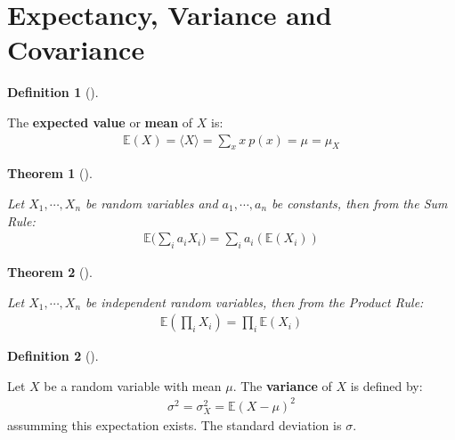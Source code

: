\documentclass[
  letterpaper,
  12pt,
  british]{tufte-book}
\theoremstyle{plain}
\newtheorem{theorem}{Theorem}[chapter]
\theoremstyle{plain}
\theoremstyle{definition}
\newtheorem{definition}{Definition}[chapter]
\theoremstyle{remark}
\begin{document}
\hypertarget{expectancy-variance-and-covariance}{%
\section{Expectancy, Variance and
Covariance}\label{expectancy-variance-and-covariance}}

\leavevmode{}%
\begin{definition}[]\label{def-mean}

The \textbf{expected value} or \textbf{mean} of \(\mathit{X}\) is:
\begin{align}
        \mathbb{E}(\mathit{X})=\langle \mathit{X}\rangle = \sum_{x} \mathit{x}~p(\mathit{x}) = \mu = \mu_X
\end{align}

\end{definition}

\leavevmode{}%
\begin{theorem}[]\label{thm-sum_rule}

Let \(\mathit{X}_1, \cdots, \mathit{X}_n\) be random variables and
\(a_1, \cdots, a_n\) be constants, then from the \emph{Sum Rule}:
\begin{align}
        \mathbb{E}\biggl(\sum_i a_i\mathit{X}_i\biggr)=\sum_i a_i(\mathbb{E}(\mathit{X}_i))
\end{align}

\end{theorem}

\leavevmode{}%
\begin{theorem}[]\label{thm-product_rule}

Let \(\mathit{X}_1, \cdots, \mathit{X}_n\) be independent random
variables, then from the \emph{Product Rule}: \begin{align}
        \mathbb{E}(\prod_i \mathit{X}_i)=\prod_i \mathbb{E}(\mathit{X}_i)
\end{align}

\end{theorem}

\leavevmode{}%
\begin{definition}[]\label{def-variance}

Let \(\mathit{X}\) be a random variable with mean \(\mu\). The
\textbf{variance} of \(\mathit{X}\) is defined by: \begin{align}
    \sigma^2 = \sigma_{\mathit{X}}^2 =\mathbb{E}{(\mathit{X}- \mu)}^2
\end{align} assumming this expectation exists. The standard deviation is
\(\sigma\).

\end{definition}
\end{document}
